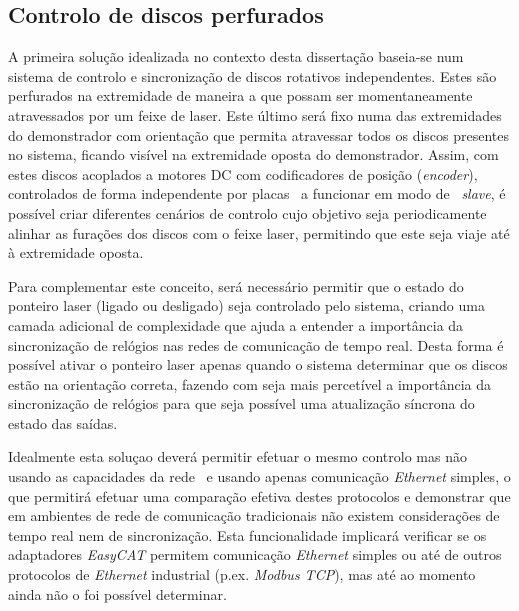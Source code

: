 \subsection{Controlo de discos perfurados}\label{sec:discs_project}

A primeira solução idealizada no contexto desta dissertação baseia-se num
sistema de controlo e sincronização de discos rotativos independentes.
Estes são perfurados na extremidade de maneira a que possam ser momentaneamente atravessados por um feixe de laser. Este último será fixo numa das extremidades
do demonstrador com orientação que permita atravessar todos os discos presentes
no sistema, ficando visível na extremidade oposta do demonstrador. Assim,
com estes discos acoplados a motores DC com codificadores de posição (\emph{encoder}),
controlados de forma independente por placas \arduino\ a funcionar em modo
de \ecat\ \emph{slave}, é possível criar diferentes cenários de controlo
cujo objetivo seja periodicamente alinhar as furações dos discos com o
feixe laser, permitindo que este seja viaje até à extremidade oposta.

Para complementar este conceito, será necessário permitir que o estado
do ponteiro laser (ligado ou desligado) seja controlado pelo sistema,
criando uma camada adicional de complexidade que ajuda a entender a
importância da sincronização de relógios nas redes de comunicação de
tempo real. Desta forma é possível ativar o ponteiro laser apenas quando
o sistema  determinar que os discos estão na orientação correta, fazendo
com seja mais percetível a importância da sincronização de relógios para
que seja possível uma atualização síncrona do estado das saídas.

Idealmente esta soluçao deverá permitir efetuar o mesmo controlo mas não
usando as capacidades da rede \ecat\ e usando apenas comunicação
\emph{Ethernet} simples, o que permitirá efetuar uma comparação efetiva
destes protocolos e demonstrar que em ambientes de rede de comunicação
tradicionais não existem considerações de tempo real nem de sincronização.
Esta funcionalidade implicará verificar se os adaptadores \emph{EasyCAT}
permitem comunicação \emph{Ethernet} simples ou até de outros protocolos
de \emph{Ethernet} industrial (p.ex. \emph{Modbus TCP}), mas até ao momento
ainda não o foi possível determinar.

